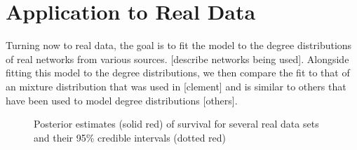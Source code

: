 \documentclass[
  sn-basic,
]{sn-jnl}
\theoremstyle{plain}
\theoremstyle{remark}
\begin{document}
\section{Application to Real Data}\label{sec-real}

Turning now to real data, the goal is to fit the model to the degree
distributions of real networks from various sources. {[}describe
networks being used{]}. Alongside fitting this model to the degree
distributions, we then compare the fit to that of an mixture
distribution that was used in {[}clement{]} and is similar to others
that have been used to model degree distributions {[}others{]}.

\begin{figure}[H]


\caption{\label{fig-real1}Posterior estimates (solid red) of survival
for several real data sets and their 95\% credible intervals (dotted
red)}

\end{figure}%
\end{document}
